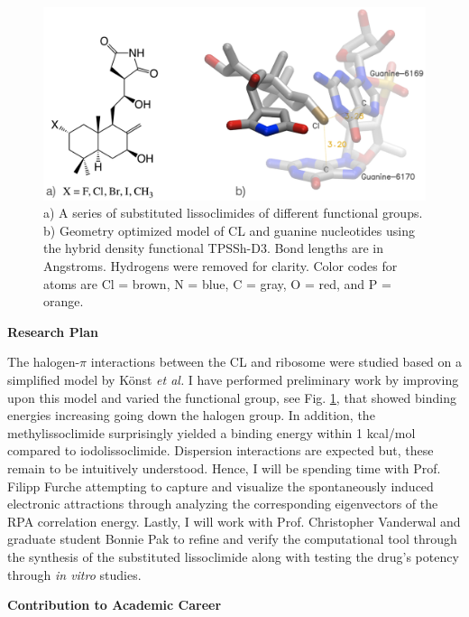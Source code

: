 \documentclass[11pt]{article}
\begin{document}
\begin{figure}
  \vspace{-20pt}
  \centering
  \includegraphics[scale=0.12]{combined.png}
  \caption{a) A series of substituted lissoclimides of different functional groups.
    b) Geometry optimized model of CL and guanine nucleotides using the hybrid
    density functional TPSSh-D3.\autocite{Staroverov03JChemPhys119p12129,Grimme12ChemEurJ18p9955}
    Bond lengths are in Angstroms. Hydrogens were removed for clarity. Color codes
    for atoms are Cl = brown, N = blue, C = gray, O = red, and P = orange.\vspace{-11pt}}
  \label{fig:model}
\end{figure}

\textbf{Research Plan}

The halogen-$\pi$ interactions between the CL and ribosome were
studied based on a simplified model by K{\"o}nst \textit{et al.}\autocite{Konst2017}
I have performed preliminary work by improving upon this model and
varied the functional group, see Fig. \ref{fig:model},
that showed binding energies increasing going down the halogen group. In addition,
the methylissoclimide surprisingly yielded a binding energy within 1
kcal/mol compared to iodolissoclimide. Dispersion interactions are expected
but, these remain to be intuitively understood. Hence, I will be spending time with
Prof. Filipp Furche attempting to capture and visualize the spontaneously induced
electronic attractions through analyzing the corresponding eigenvectors of the RPA
correlation energy. Lastly, I will work with Prof. Christopher Vanderwal and graduate
student Bonnie Pak to refine
and verify the computational tool through the synthesis of the substituted lissoclimide
along with testing the drug's potency through \textit{in vitro} studies.

\textbf{Contribution to Academic Career}
\end{document}
